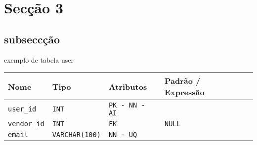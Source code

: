 \section{Secção 3} \label{section: seccao 3}

\subsection{subseccção}
exemplo de tabela user

    \begin{table}[H]
        \centering
        \begin{tabularx}{\linewidth}{XXXXX}
        \toprule
        \textbf{\color{color_scheme}Nome} & \textbf{\color{color_scheme}Tipo} & \textbf{\color{color_scheme}Atributos} & \textbf{\color{color_scheme}Padrão / Expressão}\\
        \midrule
        \texttt{user\_id} & \texttt{INT} & \texttt{PK - NN - AI} &\\
        \texttt{vendor\_id} & \texttt{INT}  & \texttt{FK}  & \texttt{NULL} \\
        \texttt{email} & \texttt{VARCHAR(100)}  & \texttt{NN - UQ}  & \\
        \bottomrule
        \end{tabularx}
        \label{table: user}
    \end{table}
